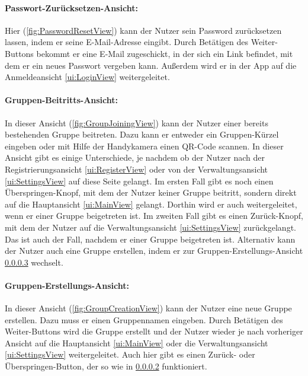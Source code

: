\documentclass[parskip=full]{scrartcl}
\begin{document}
\paragraph{Passwort-Zurücksetzen-Ansicht:}
\label{ui:PasswordResetView}
Hier (\autoref{fig:PasswordResetView}) kann der Nutzer sein Password zurücksetzen lassen, indem er seine E-Mail-Adresse eingibt. Durch Betätigen des Weiter-Buttons bekommt er eine E-Mail zugeschickt, in der sich ein Link befindet, mit dem er ein neues Passwort vergeben kann. Außerdem wird er in der App auf die Anmeldeansicht \ref{ui:LoginView} weitergeleitet.

\paragraph{Gruppen-Beitritts-Ansicht:}
\label{ui:GroupJoiningView}
In dieser Ansicht (\autoref{fig:GroupJoiningView}) kann der Nutzer einer bereits bestehenden Gruppe beitreten. Dazu kann er entweder ein Gruppen-Kürzel eingeben oder mit Hilfe der Handykamera einen QR-Code scannen. In dieser Ansicht gibt es einige Unterschiede, je nachdem ob der Nutzer nach der Registrierungsansicht \ref{ui:RegisterView} oder von der Verwaltungsansicht \ref{ui:SettingsView} auf diese Seite gelangt. Im ersten Fall gibt es noch einen Überspringen-Knopf, mit dem der Nutzer keiner Gruppe beitritt, sondern direkt auf die Hauptansicht \ref{ui:MainView} gelangt. Dorthin wird er auch weitergeleitet, wenn er einer Gruppe beigetreten ist. Im zweiten Fall gibt es einen Zurück-Knopf, mit dem der Nutzer auf die Verwaltungsansicht \ref{ui:SettingsView} zurückgelangt. Das ist auch der Fall, nachdem er einer Gruppe beigetreten ist.
Alternativ kann der Nutzer auch eine Gruppe erstellen, indem er zur Gruppen-Erstellungs-Ansicht \ref{ui:GroupCreationView} wechselt.

\paragraph{Gruppen-Erstellungs-Ansicht:}
\label{ui:GroupCreationView}
In dieser Ansicht (\autoref{fig:GroupCreationView}) kann der Nutzer eine neue Gruppe erstellen. Dazu muss er einen Gruppennamen eingeben. Durch Betätigen des Weiter-Buttons wird die Gruppe erstellt und der Nutzer wieder je nach vorheriger Ansicht auf die Hauptansicht \ref{ui:MainView} oder die Verwaltungsansicht \ref{ui:SettingsView} weitergeleitet. Auch hier gibt es einen Zurück- oder Überspringen-Button, der so wie in \ref{ui:GroupJoiningView} funktioniert.
\end{document}
